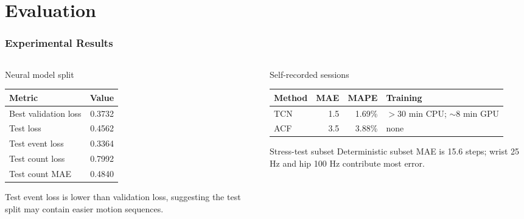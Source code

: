 \section{Evaluation}

\begin{frame}
    \frametitle{Experimental Results}
    \footnotesize
    \begin{columns}[t]
        \begin{column}{0.48\textwidth}
            \begin{block}{Neural model split}
            \begin{table}
                \centering
                \begin{tabular}{lr}
                    \toprule
                    Metric & Value \\
                    \midrule
                    Best validation loss & 0.3732 \\
                    Test loss & 0.4562 \\
                    Test event loss & 0.3364 \\
                    Test count loss & 0.7992 \\
                    Test count MAE & 0.4840 \\
                    \bottomrule
                \end{tabular}
            \end{table}
            \end{block}
            \scriptsize Test event loss is lower than validation loss, suggesting the test split may contain easier motion sequences.
        \end{column}
        \begin{column}{0.48\textwidth}
            \begin{block}{Self-recorded sessions}
                \scriptsize
                \begin{tabular}{lrrp{}}
                    \toprule
                    Method & MAE & MAPE & Training \\
                    \midrule
                    TCN & 1.5 & 1.69\% & $>$30 min CPU; $\sim$8 min GPU \\
                    ACF & 3.5 & 3.88\% & none \\
                    \bottomrule
                \end{tabular}
            \end{block}
            \begin{alertblock}{Stress-test subset}
                Deterministic subset MAE is 15.6 steps; wrist 25 Hz and hip 100 Hz contribute most error.
            \end{alertblock}
        \end{column}
    \end{columns}
\end{frame}

